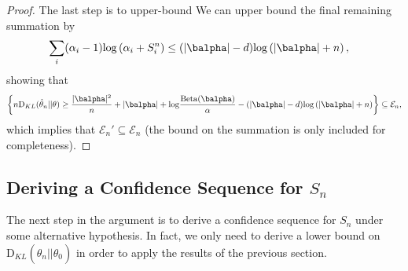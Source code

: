 \documentclass[11pt]{article}
\def\log{{\rm log}}
\newcommand{\Beta}{\mathrm{Beta}}
\newcommand{\KL}{\mathrm{D}_{KL}}
\begin{document}
\begin{proof}
The last step is to upper-bound
We can upper bound the final remaining summation by
\begin{align*}
  \sum_i(\alpha_i-1)\log
  \left(
  \alpha_i + S_i^n
  \right)
  &\leq
    (|\balpha|-d)\log
    \left(
    |\balpha|+n
    \right),
\end{align*}
showing that
\[
      \left\{
    n \KL(\hat\theta_n|| \theta)
    \geq
      \frac{|\balpha|^2}{n} + |\balpha|
      +\log\frac{\Beta(\balpha)}{\alpha}
      -
          (|\balpha|-d)\log
    \left(
    |\balpha|+n
    \right)
  \right\}
  \subseteq \mathcal E_n,
\]
which implies that $\mathcal E_n' \subseteq \mathcal E_n$ (the bound on the summation is only included for completeness).
\end{proof}

\subsection{Deriving a Confidence Sequence for $S_n$}
The next step in the argument is to derive a confidence sequence for $S_n$ under some alternative hypothesis. In fact, we only need to derive a lower bound on $\KL (\hat\theta_n||\theta_0)$ in order to apply the results of the previous section.
\end{document}
